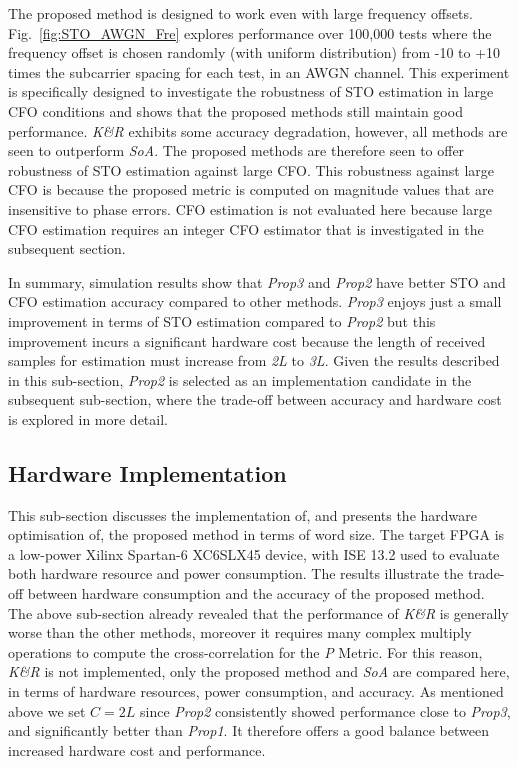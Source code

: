 The proposed method is designed to work even with large frequency offsets.
Fig.~\ref{fig:STO_AWGN_Fre} explores performance over 100,000 tests where the frequency offset is chosen randomly (with uniform distribution) from -10 to +10 times the subcarrier spacing for each test, in an AWGN channel.
This experiment is specifically designed to investigate the robustness of STO estimation in large CFO conditions and shows that the proposed methods still maintain good performance. \textit{K\&R} exhibits some accuracy degradation, however, all methods are seen to outperform \textit{SoA}. The proposed methods are therefore seen to offer robustness of STO estimation against large CFO.
This robustness against large CFO is because the proposed metric is computed on magnitude values that are insensitive to phase errors.
CFO estimation is not evaluated here because large CFO estimation requires an integer CFO estimator that is investigated in the subsequent section.

In summary, simulation results show that \textit{Prop3} and \textit{Prop2} have better STO and CFO estimation accuracy compared to other methods.
\textit{Prop3} enjoys just a small improvement in terms of STO estimation compared to \textit{Prop2} but this improvement incurs a significant hardware cost because the length of received samples for estimation must increase from \emph{2L} to \emph{3L}.
Given the results described in this sub-section, \textit{Prop2} is selected as an implementation candidate in the subsequent sub-section, where the trade-off between accuracy and hardware cost is explored in more detail.

\subsection{Hardware Implementation}
This sub-section discusses the implementation of, and presents the hardware optimisation of, the proposed method in terms of word size. The target FPGA is a low-power Xilinx Spartan-6 XC6SLX45 device, with ISE 13.2 used to evaluate both hardware resource and power consumption.
The results illustrate the trade-off between hardware consumption and the accuracy of the proposed method.
The above sub-section already revealed that the performance of \textit{K\&R} is generally worse than the other methods, moreover it requires many complex multiply operations to compute the cross-correlation for the \emph{P} Metric. For this reason, \textit{K\&R} is not implemented, only the proposed method and \textit{SoA} are compared here, in terms of hardware resources, power consumption, and accuracy. As mentioned above we set  $C=2L$ since \textit{Prop2} consistently showed performance close to \textit{Prop3}, and significantly better than \textit{Prop1}. It  therefore offers a good balance between increased hardware cost and performance.

